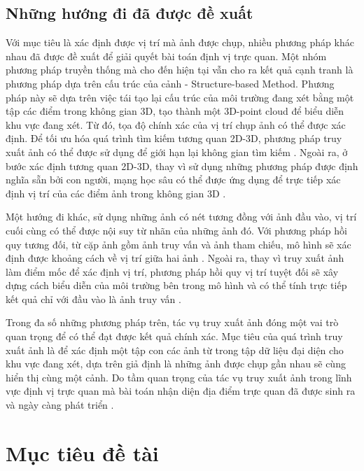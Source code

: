 \subsection{Những hướng đi đã được đề xuất}

Với mục tiêu là xác định được vị trí mà ảnh được chụp, nhiều phương pháp khác nhau đã được đề xuất để giải quyết bài toán định vị trực quan. Một nhóm phương pháp truyền thống mà cho đến hiện tại vẫn cho ra kết quả cạnh tranh là phương pháp dựa trên cấu trúc của cảnh - Structure-based Method. Phương pháp này sẽ dựa trên việc tái tạo lại cấu trúc của môi trường đang xét bằng một tập các điểm trong không gian 3D, tạo thành một 3D-point cloud để biểu diễn khu vực đang xét. Từ đó, tọa độ chính xác của vị trí chụp ảnh có thể được xác định. Để tối ưu hóa quá trình tìm kiếm tương quan 2D-3D, phương pháp truy xuất ảnh có thể được sử dụng để giới hạn lại không gian tìm kiếm \cite{sarlin2019coarse}. Ngoài ra, ở bước xác định tương quan 2D-3D, thay vì sử dụng những phương pháp được định nghĩa sẵn bởi con người, mạng học sâu có thể được ứng dụng để trực tiếp xác định vị trí của các điểm ảnh trong không gian 3D \cite{brachmann2021visual}. 

Một hướng đi khác, sử dụng những ảnh có nét tương đồng với ảnh đầu vào, vị trí cuối cùng có thể được nội suy từ nhãn của những ảnh đó. Với phương pháp hồi quy tương đối, từ cặp ảnh gồm ảnh truy vấn và ảnh tham chiếu, mô hình sẽ xác định được khoảng cách về vị trí giữa hai ảnh \cite{zhou2020learn}. Ngoài ra, thay vì truy xuất ảnh làm điểm mốc để xác định vị trí, phương pháp hồi quy vị trí tuyệt đối sẽ xây dựng cách biểu diễn của môi trường bên trong mô hình và có thể tính trực tiếp kết quả chỉ với đầu vào là ảnh truy vấn \cite{kendall2016posenet}.

Trong đa số những phương pháp trên, tác vụ truy xuất ảnh đóng một vai trò quan trọng để có thể đạt được kết quả chính xác. Mục tiêu của quá trình truy xuất ảnh là để xác định một tập con các ảnh từ trong tập dữ liệu đại diện cho khu vực đang xét, dựa trên giả định là những ảnh được chụp gần nhau sẽ cùng hiển thị cùng một cảnh. Do tầm quan trọng của tác vụ truy xuất ảnh trong lĩnh vực định vị trực quan mà bài toán nhận diện địa điểm trực quan đã được sinh ra và ngày càng phát triển \cite{berton2022rethinking}\cite{keetha2023anyloc}\cite{alibey2023mixvpr}.

\section{Mục tiêu đề tài}

